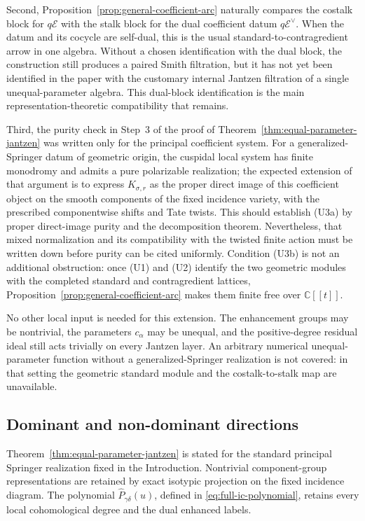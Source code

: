 \documentclass[11pt]{amsart}
\theoremstyle{definition}
\theoremstyle{remark}
\begin{document}
Second, Proposition~\ref{prop:general-coefficient-arc} naturally compares
the costalk block for $q\mathcal E$ with the stalk block for the dual
coefficient datum $q\mathcal E^\vee$.  When the datum and its cocycle are
self-dual, this is the usual standard-to-contragredient arrow in one algebra.
Without a chosen identification with the dual block, the construction still
produces a paired Smith filtration, but it has not yet been identified in
the paper with the customary internal Jantzen filtration of a single
unequal-parameter algebra.  This dual-block identification is the main
representation-theoretic compatibility that remains.

Third, the purity check in Step~3 of the proof of
Theorem~\ref{thm:equal-parameter-jantzen} was written only for the principal coefficient
system.  For a generalized-Springer datum of geometric origin, the cuspidal
local system has finite monodromy and admits a pure polarizable realization;
the expected extension of that argument is to express
$K_{\sigma,r}$ as the proper direct image of this coefficient object on the
smooth components of the fixed incidence variety, with the prescribed
componentwise shifts and Tate twists.  This should establish (U3a) by proper
direct-image purity and the decomposition theorem.  Nevertheless, that
mixed normalization and its compatibility with
the twisted finite action must be written down before purity can be cited
uniformly.  Condition (U3b) is not an additional obstruction: once (U1) and
(U2) identify the two geometric modules with the completed standard and
contragredient lattices, Proposition~\ref{prop:general-coefficient-arc}
makes them finite free over $\mathbb C[[t]]$.

No other local input is needed for this extension.  The enhancement groups
may be nontrivial, the parameters $c_\alpha$ may be unequal, and the
positive-degree residual ideal still acts trivially on every Jantzen layer.
An arbitrary numerical unequal-parameter function without a
generalized-Springer realization is not covered: in that setting the
geometric standard module and the costalk-to-stalk map are unavailable.

\subsection{Dominant and non-dominant directions}

Theorem~\ref{thm:equal-parameter-jantzen} is stated for the standard principal Springer
realization fixed in the Introduction.  Nontrivial component-group
representations are retained by exact isotypic projection on the fixed
incidence diagram.  The polynomial
$\widehat P_{\gamma\delta}(u)$, defined in
\eqref{eq:full-ic-polynomial}, retains every local cohomological degree and
the dual enhanced labels.
\end{document}

